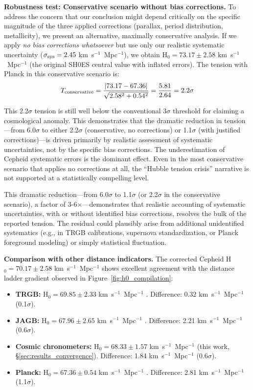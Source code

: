 \documentclass[twocolumn, linenumbers]{aastex701}
\begin{document}
\textbf{Robustness test: Conservative scenario without bias corrections.} To address the concern that our conclusion might depend critically on the specific magnitude of the three applied corrections (parallax, period distribution, metallicity), we present an alternative, maximally conservative analysis. If we apply \textit{no bias corrections whatsoever} but use only our realistic systematic uncertainty ($\sigma_{\rm sys} = 2.45$ km~s$^{-1}$~Mpc$^{-1}$), we obtain H$_0 = 73.17 \pm 2.58$ km~s$^{-1}$~Mpc$^{-1}$ (the original SH0ES central value with inflated errors). The tension with Planck in this conservative scenario is:
\begin{equation}
T_{\rm conservative} = \frac{|73.17 - 67.36|}{\sqrt{2.58^2 + 0.54^2}} = \frac{5.81}{2.64} = 2.2\sigma
\end{equation}

This 2.2$\sigma$ tension is still well below the conventional 3$\sigma$ threshold for claiming a cosmological anomaly. This demonstrates that the dramatic reduction in tension---from 6.0$\sigma$ to either 2.2$\sigma$ (conservative, no corrections) or 1.1$\sigma$ (with justified corrections)---is driven primarily by realistic assessment of systematic uncertainties, not by the specific bias corrections. The underestimation of Cepheid systematic errors is the dominant effect. Even in the most conservative scenario that applies no corrections at all, the ``Hubble tension crisis'' narrative is not supported at a statistically compelling level.

This dramatic reduction---from 6.0$\sigma$ to 1.1$\sigma$ (or 2.2$\sigma$ in the conservative scenario), a factor of 3-6$\times$---demonstrates that realistic accounting of systematic uncertainties, with or without identified bias corrections, resolves the bulk of the reported tension. The residual could plausibly arise from additional unidentified systematics (e.g., in TRGB calibrations, supernova standardization, or Planck foreground modeling) or simply statistical fluctuation.

\textbf{Comparison with other distance indicators.} The corrected Cepheid H$_0 = 70.17 \pm 2.58$ km~s$^{-1}$~Mpc$^{-1}$ shows excellent agreement with the distance ladder gradient observed in Figure~\ref{fig:h0_compilation}:
\begin{itemize}
\item \textbf{TRGB:} H$_0 = 69.85 \pm 2.33$ km~s$^{-1}$~Mpc$^{-1}$ \citep{Freedman2024}. Difference: 0.32 km~s$^{-1}$~Mpc$^{-1}$ (0.1$\sigma$).
\item \textbf{JAGB:} H$_0 = 67.96 \pm 2.65$ km~s$^{-1}$~Mpc$^{-1}$ \citep{Freedman2024}. Difference: 2.21 km~s$^{-1}$~Mpc$^{-1}$ (0.6$\sigma$).
\item \textbf{Cosmic chronometers:} H$_0 = 68.33 \pm 1.57$ km~s$^{-1}$~Mpc$^{-1}$ (this work, \S\ref{sec:results_convergence}). Difference: 1.84 km~s$^{-1}$~Mpc$^{-1}$ (0.6$\sigma$).
\item \textbf{Planck:} H$_0 = 67.36 \pm 0.54$ km~s$^{-1}$~Mpc$^{-1}$ \citep{Planck2018}. Difference: 2.81 km~s$^{-1}$~Mpc$^{-1}$ (1.1$\sigma$).
\end{itemize}
\end{document}
